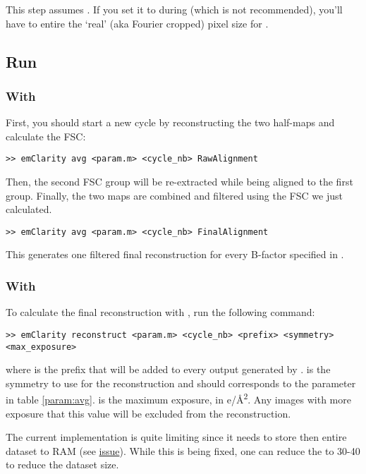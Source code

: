 \begin{note}This step assumes . If you set it to  during  (which is not recommended), you'll have to entire the `real' (aka Fourier cropped) pixel size for .\end{note}

\subsection{Run}

\subsubsection{With {\emClarity}}

First, you should start a new cycle by reconstructing the two half-maps and calculate the FSC:
\begin{lstlisting}
>> emClarity avg <param.m> <cycle_nb> RawAlignment
\end{lstlisting}
Then, the second FSC group will be re-extracted while being aligned to the first group. Finally, the two maps are combined and filtered using the FSC we just calculated.
\begin{lstlisting}
>> emClarity avg <param.m> <cycle_nb> FinalAlignment
\end{lstlisting}
This generates one filtered final reconstruction for every B-factor specified in .

\subsubsection{With {\cisTEM}}
To calculate the final reconstruction with {\cisTEM}, run the following command:
\begin{lstlisting}
>> emClarity reconstruct <param.m> <cycle_nb> <prefix> <symmetry> <max_exposure>
\end{lstlisting}
where  is the prefix that will be added to every output generated by {\cisTEM}.  is the symmetry to use for the reconstruction and should corresponds to the  parameter in table \ref{param:avg}.  is the maximum exposure, in e/\r{A}\textsuperscript{2}. Any images with more exposure that this value will be excluded from the reconstruction.

\begin{note}The current implementation is quite limiting since it needs to store then entire dataset to RAM (see \href{https://github.com/bHimes/emClarity/issues/139}{issue}). While this is being fixed, one can reduce the  to 30-40 to reduce the dataset size.\end{note}

